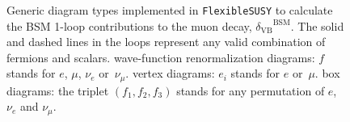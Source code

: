 \documentclass[final,3p,11pt,pdflatex]{elsarticle}
\makeatletter
\newcommand{\fs}{\texttt{FlexibleSUSY}\@\xspace}
\newcommand{\BSM}{\ensuremath{\text{BSM}}\xspace}
\newcommand{\deltaVB}{\ensuremath{\delta_{\text{VB}}}\xspace}
\makeatother
\begin{document}
\begin{figure}[tbh]
  \centering
  \caption{Generic diagram types implemented in \fs to calculate
  the BSM 1-loop contributions to the muon decay, $\deltaVB^\BSM$.
  The solid and dashed lines in the loops represent any valid
  combination of fermions and scalars.
  \protect{} wave-function
  renormalization diagrams: $f$ stands for $e$, $\mu$, $\nu_e$
  or~$\nu_\mu$.
  \protect{} vertex diagrams:
  $e_i$ stands for $e$ or~$\mu$.
  \protect{} box diagrams:
  the triplet $(f_1, f_2, f_3)$ stands for any permutation of
  $e$, $\nu_e$ and $\nu_\mu$.}
  \label{fig:delta_VB_diagram_types}
\end{figure}
%
\end{document}
